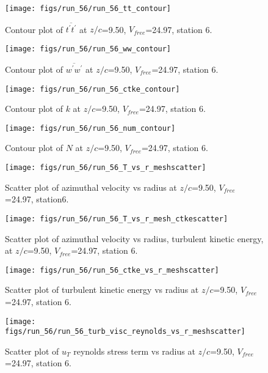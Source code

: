\begin{figure}[H]
\centering
\texttt{[image: figs/run\_56/run\_56\_tt\_contour]}
\caption{Contour plot of $\overline{t^\prime t^\prime}$ at $z/c$=9.50, $V_{free}$=24.97, station 6.}
\end{figure}


\begin{figure}[H]
\centering
\texttt{[image: figs/run\_56/run\_56\_ww\_contour]}
\caption{Contour plot of $\overline{w^\prime w^\prime}$ at $z/c$=9.50, $V_{free}$=24.97, station 6.}
\end{figure}


\begin{figure}[H]
\centering
\texttt{[image: figs/run\_56/run\_56\_ctke\_contour]}
\caption{Contour plot of $k$ at $z/c$=9.50, $V_{free}$=24.97, station 6.}
\end{figure}


\begin{figure}[H]
\centering
\texttt{[image: figs/run\_56/run\_56\_num\_contour]}
\caption{Contour plot of $N$ at $z/c$=9.50, $V_{free}$=24.97, station 6.}
\end{figure}


\begin{figure}[H]
\centering
\texttt{[image: figs/run\_56/run\_56\_T\_vs\_r\_meshscatter]}
\caption{Scatter plot of azimuthal velocity vs radius at $z/c$=9.50, $V_{free}$=24.97, station6.}
\end{figure}


\begin{figure}[H]
\centering
\texttt{[image: figs/run\_56/run\_56\_T\_vs\_r\_mesh\_ctkescatter]}
\caption{Scatter plot of azimuthal velocity vs radius, turbulent kinetic energy, at $z/c$=9.50, $V_{free}$=24.97, station 6.}
\end{figure}


\begin{figure}[H]
\centering
\texttt{[image: figs/run\_56/run\_56\_ctke\_vs\_r\_meshscatter]}
\caption{Scatter plot of turbulent kinetic energy vs radius at $z/c$=9.50, $V_{free}$=24.97, station 6.}
\end{figure}


\begin{figure}[H]
\centering
\texttt{[image: figs/run\_56/run\_56\_turb\_visc\_reynolds\_vs\_r\_meshscatter]}
\caption{Scatter plot of $
u_T$ reynolds stress term vs radius at $z/c$=9.50, $V_{free}$=24.97, station 6.}
\end{figure}


